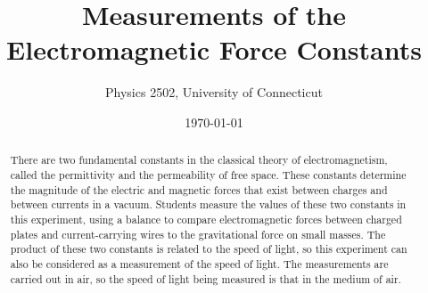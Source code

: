 \documentclass{revtex4}
\begin{document}

\title{Measurements of the Electromagnetic Force Constants}


\author{Physics 2502, University of Connecticut}


\date{\today}

\begin{abstract}
There are two fundamental constants in the classical theory of
electromagnetism, called the permittivity and the permeability of
free space.  These constants determine the magnitude of the electric
and magnetic forces that exist between charges and between currents in
a vacuum.  Students measure the values of these two constants in this
experiment, using a balance to compare electromagnetic forces between
charged plates and current-carrying wires to the gravitational force
on small masses.  The product of these two constants is related to the
speed of light, so this experiment can also be considered as a measurement
of the speed of light.  The measurements are carried out in air, so the
speed of light being measured is that in the medium of air.
\end{abstract}

\end{document}
